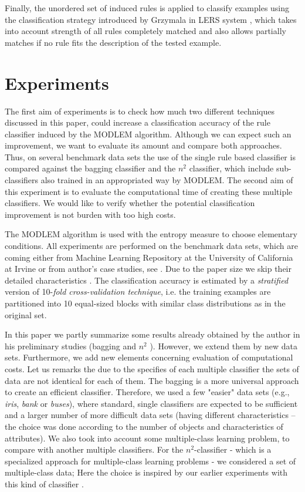 \documentclass{llncs}
\begin{document}
Finally, the unordered set of induced rules is applied to classify examples
using the classification strategy introduced by Grzymala in LERS system
\cite{GrzymClass}, which takes into account strength of all rules completely
matched and also allows partially matches if no rule fits the description of
the tested example.


\section{Experiments}

The first aim of experiments is to check how much two different techniques
 discussed in this paper, could increase a classification accuracy of
 the rule classifier induced by the MODLEM algorithm. Although we
 can expect such an improvement, we want to evaluate its amount and
 compare both approaches.  Thus, on several benchmark data sets
the use of the single rule based classifier is compared against
the bagging classifier and the $n^2$ classifier, which include
sub-classifiers also trained in an appropriated way by MODLEM. The
second aim of this experiment is to evaluate the computational
time of creating these multiple classifiers. We would like to
verify whether the potential classification  improvement is not
burden with too high costs.

The MODLEM algorithm is used with the entropy measure to choose elementary
conditions. All experiments are performed on the
 benchmark data sets, which are coming either from Machine Learning Repository at
the University of California at Irvine \cite{irvine} or from
author's case studies, see \cite{habcia}. Due to the paper size we
skip their detailed characteristics . The classification accuracy
is estimated by a {\em stratified} version of 10-{\em fold
cross-validation technique}, i.e. the training examples are
partitioned into 10 equal-sized blocks with similar class
distributions as in the original set.

In this paper we partly summarize some results already obtained by the
author in his preliminary studies (bagging \cite{Ste02} and $n^2$
\cite{habcia}). However, we extend them by new data sets. Furthermore, we
add new elements concerning evaluation of computational costs. Let us
remarks the due to the specifies of each multiple classifier the sets of
data are not identical for each of them. The bagging is a more universal
approach to create an efficient classifier. Therefore, we used a few
"easier" data sets (e.g., {\em iris}, {\em bank} or {\em buses}), where
standard, single classifiers are expected to be sufficient and a larger
number of more difficult data sets (having different characteristics -- the
choice was done according to the number of objects and characteristics of
attributes). We also took into account some multiple-class learning problem,
to compare with another multiple classifiers. For the $n^2$-classifier -
which is a specialized approach for multiple-class learning problems - we
considered a set of multiple-class data; Here the choice is inspired by our
earlier experiments with this kind of classifier \cite{JelStef98,JelStef01}.
\end{document}
